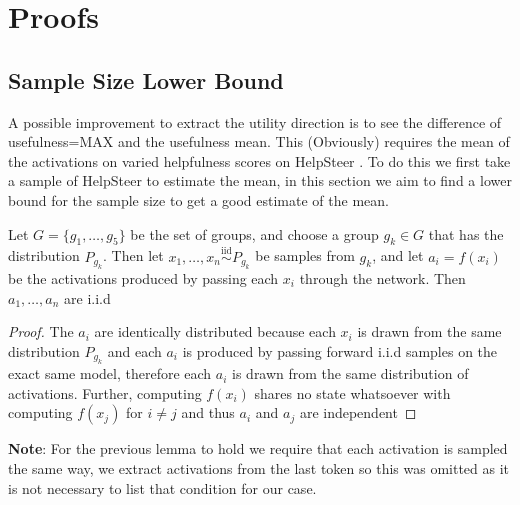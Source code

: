 \section{Proofs}
\label{proof}
\subsection{Sample Size Lower Bound}
A possible improvement to extract the utility direction is to see the difference of usefulness=MAX and the usefulness mean. 
This (Obviously) requires the mean of the activations on varied helpfulness scores on HelpSteer \citep{wang-etal-2024-helpsteer}. 
To do this we first take a sample of HelpSteer to estimate the mean, in this section we aim to find a lower bound for the sample size 
to get a good estimate of the mean.

\begin{lemma}
Let $G = \{g_1, \dots, g_5\}$ be the set of groups, and choose a group $g_k \in G$ 
that has the distribution $P_{g_k}$. Then let $x_1, \dots, x_n \stackrel{\mathrm{iid}}{\sim} P_{g_k}$ 
be samples from $g_k$, and let $a_i = f(x_i)$ be the activations produced by passing 
each $x_i$ through the network. Then $a_1, \dots, a_n$ are i.i.d
\end{lemma}

\begin{proof}
The $a_i$ are identically distributed because each $x_i$ is drawn from the same 
distribution $P_{g_k}$ and each $a_i$ is produced by passing forward i.i.d samples on the
exact same model, therefore each $a_i$ is drawn from the same distribution of activations. 
Further, computing $f(x_i)$ shares no state whatsoever with computing $f(x_j)$ for
$i \neq j$ and thus $a_i$ and $a_j$ are independent \qedhere
\end{proof}

\textbf{Note}: For the previous lemma to hold we require that each activation is sampled the same way, we extract activations from 
the last token so this was omitted as it is not necessary to list that condition for our case.

